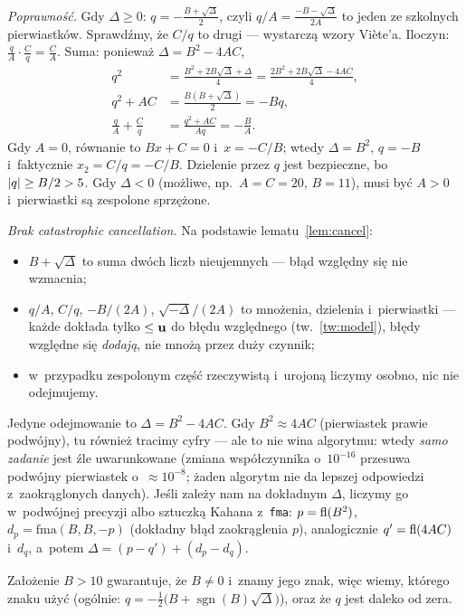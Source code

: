 \documentclass[11pt]{article}
\begin{document}
\emph{Poprawność.} Gdy $\Delta\ge0$: $q=-\frac{B+\sqrt\Delta}{2}$, czyli
$q/A=\frac{-B-\sqrt\Delta}{2A}$ to jeden ze szkolnych pierwiastków. Sprawdźmy,
że $C/q$ to drugi --- wystarczą wzory Viète'a. Iloczyn:
$\frac qA\cdot\frac Cq=\frac CA$. Suma: ponieważ $\Delta=B^2-4AC$,
\begin{align*}
q^2&=\frac{B^2+2B\sqrt\Delta+\Delta}{4}=\frac{2B^2+2B\sqrt\Delta-4AC}{4},\\
q^2+AC&=\frac{B(B+\sqrt\Delta)}{2}=-Bq,\\
\frac qA+\frac Cq&=\frac{q^2+AC}{Aq}=-\frac BA.
\end{align*}
Gdy $A=0$, równanie to $Bx+C=0$ i~$x=-C/B$; wtedy $\Delta=B^2$, $q=-B$
i~faktycznie $x_2=C/q=-C/B$. Dzielenie przez $q$ jest bezpieczne, bo
$\left\lvert q \right\rvert\ge B/2>5$. Gdy $\Delta<0$ (możliwe, np.\ $A=C=20$, $B=11$),
musi być $A>0$ i~pierwiastki są zespolone sprzężone.

\emph{Brak catastrophic cancellation.} Na podstawie lematu~\ref{lem:cancel}:
\begin{itemize}
\item $B+\sqrt\Delta$ to suma dwóch liczb nieujemnych --- błąd względny się
nie wzmacnia;
\item $q/A$, $C/q$, $-B/(2A)$, $\sqrt{-\Delta}/(2A)$ to mnożenia, dzielenia
i~pierwiastki --- każde dokłada tylko $\le\mathbf{u}$ do błędu względnego
(tw.~\ref{tw:model}), błędy względne się \emph{dodają}, nie mnożą przez
duży czynnik;
\item w~przypadku zespolonym część rzeczywistą i~urojoną liczymy osobno,
nic nie odejmujemy.
\end{itemize}
Jedyne odejmowanie to $\Delta=B^2-4AC$. Gdy $B^2\approx4AC$ (pierwiastek
prawie podwójny), tu również tracimy cyfry --- ale to nie wina algorytmu:
wtedy \emph{samo zadanie} jest źle uwarunkowane (zmiana współczynnika
o~$10^{-16}$ przesuwa podwójny pierwiastek o~$\approx10^{-8}$; żaden algorytm
nie da lepszej odpowiedzi z~zaokrąglonych danych). Jeśli zależy nam na
dokładnym $\Delta$, liczymy go w~podwójnej precyzji albo sztuczką Kahana
z~\texttt{fma}: $p=\operatorname{fl}(B^2)$, $d_p=\mathrm{fma}(B,B,-p)$ (dokładny błąd
zaokrąglenia $p$), analogicznie $q'=\operatorname{fl}(4AC)$ i~$d_q$, a~potem
$\Delta=(p-q')+(d_p-d_q)$.

\begin{uwaga}
Założenie $B>10$ gwarantuje, że $B\neq0$ i~znamy jego znak, więc wiemy,
którego znaku użyć (ogólnie: $q=-\tfrac12\bigl(B+\operatorname{sgn}(B)\sqrt\Delta\bigr)$),
oraz że $q$ jest daleko od zera.
\end{uwaga}
\end{document}
